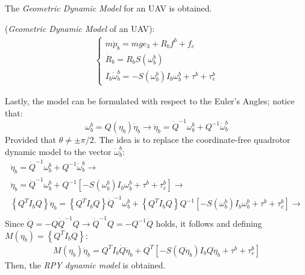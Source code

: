 The \textit{Geometric Dynamic Model} for an UAV is obtained.
\begin{definition}\label{UAV_geomtric_dyn_model_def}
    (\textit{Geometric Dynamic Model} of an UAV):
    \begin{gather}\label{UAV_geomtric_dyn_model}
        \begin{cases}
            m\ddot{p}_b=mge_3+R_bf^b+f_e\\
            \dot{R}_b=R_bS\left(\omega_b^b\right)\\
            I_b\dot{\omega}_b^b=-S\left(\omega_b^b\right)I_b\omega_b^b+\tau^b+\tau_e^b
        \end{cases}
    \end{gather}
\end{definition}
Lastly, the model can be formulated with respect to the Euler's Angles; notice that:
\begin{equation*}
    \omega_b^b=Q(\eta_b)\dot{\eta}_b\rightarrow\ddot{\eta}_b=\dot{Q}^{-1}\omega_b^b+Q^{-1}\dot{\omega}_b^b
\end{equation*}
Provided that $\theta\neq\pm\pi/2$. The idea is to replace the coordinate-free quadrotor dynamic model to the vector $\dot{\omega}_b^b$:
\begin{gather*}
    \ddot{\eta}_b=\dot{Q}^{-1}\omega_b^b+Q^{-1}\dot{\omega}_b^b\rightarrow\\
    \ddot{\eta}_b=\dot{Q}^{-1}\omega_b^b+Q^{-1}\left[-S\left(\omega_b^b\right)I_b\omega_b^b+\tau^b+\tau_e^b\right] \rightarrow \\
    \left\{Q^{T}I_bQ\right\}\ddot{\eta}_b=\left\{Q^{T}I_bQ\right\}\dot{Q}^{-1}\omega_b^b+\left\{Q^{T}I_bQ\right\}Q^{-1}\left[-S\left(\omega_b^b\right)I_b\omega_b^b+\tau^b+\tau_e^b\right] \rightarrow \\
\end{gather*}
Since $\dot{Q}=-Q\dot{Q}^{-1}Q\rightarrow\dot{Q}^{-1}Q=-Q^{-1}\dot{Q}$ holds, it follows and defining $M\left(\eta_b\right)=\left\{Q^{T}I_bQ\right\}$:
\begin{gather*}
    M\left(\eta_b\right)\ddot{\eta}_b=Q^{T}I_b\dot{Q}\dot{\eta}_b+Q^{T}\left[-S\left(Q\dot{\eta}_b\right)I_bQ\dot{\eta}_b+\tau^b+\tau_e^b\right]
\end{gather*}
Then, the \textit{RPY dynamic model} is obtained.
